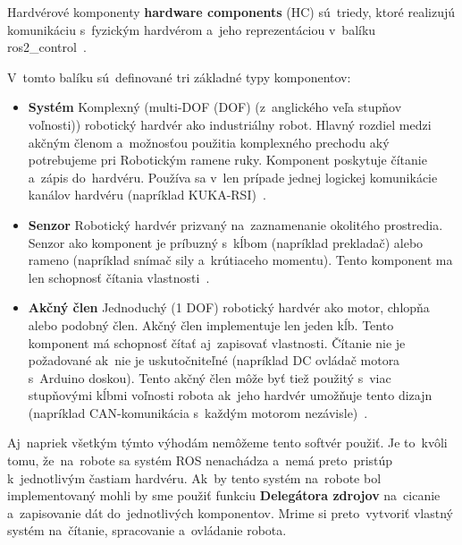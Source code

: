 Hardvérové komponenty \textbf{hardware components} (HC) sú~triedy, ktoré realizujú komunikáciu s~fyzickým hardvérom
a~jeho reprezentáciou v~balíku ros2\_control~\cite{roscontrol}.

\clearpage

V~tomto balíku sú~definované tri základné typy komponentov:

\begin{itemize}
	\item \textbf{Systém} Komplexný (multi-DOF (\acrlong{DOF}) (z~anglického veľa stupňov voľnosti)) robotický hardvér ako industriálny
		robot. Hlavný rozdiel medzi akčným členom a~možnosťou použitia komplexného prechodu aký potrebujeme pri
		Robotickým ramene ruky. Komponent poskytuje čítanie a~zápis do~hardvéru. Používa sa v~len prípade jednej
		logickej komunikácie kanálov hardvéru (napríklad KUKA-RSI)~\cite{roscontrol}.
	\item \textbf{Senzor} Robotický hardvér prizvaný na~zaznamenanie okolitého prostredia. Senzor ako komponent je
		príbuzný s~kĺbom (napríklad prekladač) alebo rameno (napríklad snímač sily a~krútiaceho momentu). Tento
		komponent ma len schopnosť čítania vlastnosti~\cite{roscontrol}.
	\item \textbf{Akčný člen} Jednoduchý (1 DOF) robotický hardvér ako motor, chlopňa alebo podobný člen.
		Akčný člen implementuje len jeden kĺb. Tento komponent má schopnosť čítať aj~zapisovať vlastnosti. Čítanie nie
		je požadované ak~nie je uskutočniteľné (napríklad DC ovládač motora s~Arduino doskou). Tento akčný člen môže byť
		tiež použitý s~viac stupňovými kĺbmi voľnosti robota ak~jeho hardvér umožňuje tento dizajn (napríklad
		CAN-komunikácia s~každým motorom nezávisle)~\cite{roscontrol}.
\end{itemize}

Aj~napriek všetkým týmto výhodám nemôžeme tento softvér použiť. Je to~kvôli tomu, že~na~robote sa systém ROS nenachádza
a~nemá preto~pristúp k~jednotlivým častiam hardvéru. Ak~by tento systém na~robote bol implementovaný mohli by sme použiť
funkciu \textbf{Delegátora zdrojov} na~cicanie a~zapisovanie dát do~jednotlivých komponentov. Mrime si preto~vytvoriť
vlastný systém na~čítanie, spracovanie a~ovládanie robota.

